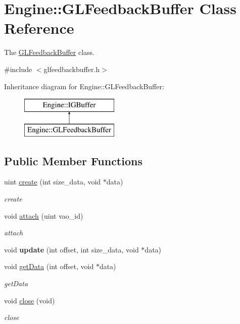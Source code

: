 \hypertarget{classEngine_1_1GLFeedbackBuffer}{}\section{Engine\+:\+:G\+L\+Feedback\+Buffer Class Reference}
\label{classEngine_1_1GLFeedbackBuffer}


The \hyperlink{classEngine_1_1GLFeedbackBuffer}{G\+L\+Feedback\+Buffer} class.  




{\ttfamily \#include $<$glfeedbackbuffer.\+h$>$}

Inheritance diagram for Engine\+:\+:G\+L\+Feedback\+Buffer\+:\begin{figure}[H]
\begin{center}
\leavevmode
\includegraphics[height=2.000000cm]{classEngine_1_1GLFeedbackBuffer}
\end{center}
\end{figure}
\subsection*{Public Member Functions}
\begin{DoxyCompactItemize}
\item 
uint \hyperlink{classEngine_1_1GLFeedbackBuffer_af07b1ef217ec8a8c77412fe417564428}{create} (int size\+\_\+data, void $\ast$data)
\begin{DoxyCompactList}\small\item\em create \end{DoxyCompactList}\item 
void \hyperlink{classEngine_1_1GLFeedbackBuffer_ae1d18bd14a843d4fcd030998498128c6}{attach} (uint vao\+\_\+id)
\begin{DoxyCompactList}\small\item\em attach \end{DoxyCompactList}\item 
\hypertarget{classEngine_1_1GLFeedbackBuffer_ac37c720e82875e06707e0d4c5c2dc3c0}{}void {\bfseries update} (int offset, int size\+\_\+data, void $\ast$data)\label{classEngine_1_1GLFeedbackBuffer_ac37c720e82875e06707e0d4c5c2dc3c0}

\item 
void \hyperlink{classEngine_1_1GLFeedbackBuffer_a8c4b82243c6652f377d7511ade32e7b5}{get\+Data} (int offset, void $\ast$data)
\begin{DoxyCompactList}\small\item\em get\+Data \end{DoxyCompactList}\item 
void \hyperlink{classEngine_1_1GLFeedbackBuffer_a278dd1fdb1b2fe62a30b7711ea1090a2}{close} (void)
\begin{DoxyCompactList}\small\item\em close \end{DoxyCompactList}\end{DoxyCompactItemize}

